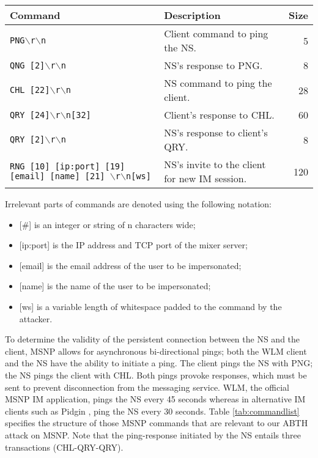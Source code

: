 \documentclass{sig-alternate}
\begin{document}
\begin{table*}[tbp]
	\centering

	\caption {MSNP Commands}
	\label{tab:commandlist}

	\begin{tabular}{llr}
		\hline
		\hline
		\textbf{Command} & \textbf{Description} & \textbf{Size} \\
		\hline
		\texttt{PNG$\backslash$r$\backslash$n} & Client command to ping the NS. & 5 \\
		\texttt{QNG [2]$\backslash$r$\backslash$n} & NS's response to PNG. & 8 \\
		\texttt{CHL [22]$\backslash$r$\backslash$n} & NS command to ping the client. & 28 \\
		\texttt{QRY [24]$\backslash$r$\backslash$n[32]} & Client's response to CHL. & 60 \\
		\texttt{QRY [2]$\backslash$r$\backslash$n} & NS's response to client's QRY. & 8 \\
		\texttt{RNG [10] [ip:port] [19] [email] [name] [21] $\backslash$r$\backslash$n[ws]} & NS's invite to the client for new IM session. & 120 \\
		\hline
	\end{tabular}

	\begin{flushleft}
	Irrelevant parts of commands are denoted using the following notation:
	\begin{itemize}
		\item {[\#]} is an integer or string of n characters wide;
		\item {[ip:port]} is the IP address and TCP port of the mixer server;
		\item {[email]} is the email address of the user to be impersonated;
		\item {[name]} is the name of the user to be impersonated;
		\item {[ws]} is a variable length of whitespace padded to the command by the attacker.
	\end{itemize}
	\end{flushleft}

\end{table*}

To determine the validity of the persistent connection between the NS and the client, MSNP allows for asynchronous bi-directional pings; both the WLM client and the NS have the ability to initiate a ping.
The client pings the NS with PNG; the NS pings the client with CHL.
Both pings provoke responses, which must be sent to prevent disconnection from the messaging service.
WLM, the official MSNP IM application, pings the NS every 45 seconds whereas in alternative IM clients such as Pidgin \cite{pidgin:url}, ping the NS every 30 seconds.
Table \ref{tab:commandlist} specifies the structure of those MSNP commands that are relevant to our ABTH attack on MSNP.
Note that the ping-response initiated by the NS entails three transactions (CHL-QRY-QRY).
\end{document}
